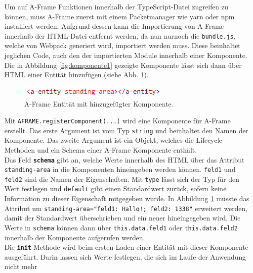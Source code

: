 \documentclass[a4paper,12pt,oneside]{article}
\begin{document}
        Um auf A-Frame Funktionen innerhalb der TypeScript-Datei zugreifen
        zu können, muss A-Frame zuerst mit einem Packetmanager wie yarn
        oder npm installiert werden. Aufgrund dessen kann die Importierung
        von A-Frame innerhalb der HTML-Datei entfernt werden, da nun
        nurnoch die \texttt{bundle.js}, welche von Webpack generiert wird,
        importiert werden muss. Diese beinhaltet jeglichen Code, auch den
        der importierten Module innerhalb einer Komponente. \\
        Die in Abbildung \ref{fig:komponente1} gezeigte Komponente lässt
        sich dann über HTML einer Entität hinzufügen 
        (siehe Abb. \ref{fig:komponente2}).
        \begin{figure}[h]
          \centering
          \includegraphics{img/coding/komponente2.png}
          \caption{A-Frame Entität mit hinzugefügter Komponente.}
          \label{fig:komponente2}
        \end{figure}
        Mit \texttt{AFRAME.registerComponent(...)} wird eine
        Komponente für A-Frame erstellt. 
        Das erste Argument ist vom Typ \texttt{string}
        und beinhaltet den Namen der Komponente. Das zweite Argument
        ist ein Objekt, welches die Lifecycle-Methoden und ein Schema 
        einer A-Frame Komponente enthält. \\
        Das Feld \texttt{\textbf{schema}} gibt an, welche Werte
        innerhalb des HTML über das Attribut \texttt{standing-area} 
        in die Komponenten hineingeben werden können. \texttt{feld1}
        und \texttt{feld2} sind die Namen der Eigenschaften. Mit \texttt{type}
        lässt sich der Typ für den Wert festlegen und \texttt{default}
        gibt einen Standardwert zurück, sofern keine Information zu dieser
        Eigenschaft mitgegeben wurde. In Abbildung \ref{fig:komponente2} müsste
        das Attribut um \texttt{standing-area="feld1: Hallo!; feld2: 1338"}
        erweitert werden, damit der Standardwert überschrieben und ein
        neuer hineingegeben wird. Die Werte in \texttt{schema} können dann
        über \texttt{this.data.feld1} oder \texttt{this.data.feld2} 
        innerhalb der Komponente aufgerufen werden. \\
        Die \texttt{\textbf{init}}-Methode wird beim ersten Laden einer
        Entität mit dieser Komponente ausgeführt. Darin lassen sich
        Werte festlegen, die sich im Laufe der Anwendung nicht mehr 
\end{document}
